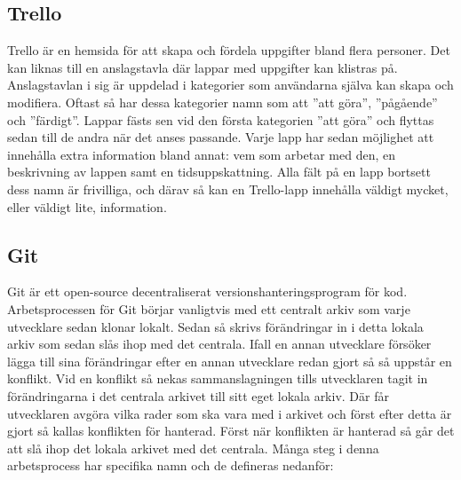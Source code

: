 \subsection*{Trello}
Trello är en hemsida för att skapa och fördela uppgifter bland flera personer. Det kan liknas till en anslagstavla där lappar med uppgifter kan klistras på. Anslagstavlan i sig är uppdelad i kategorier som användarna själva kan skapa och modifiera. Oftast så har dessa kategorier namn som att ''att göra'', ''pågående'' och ''färdigt''. Lappar fästs sen vid den första kategorien ''att göra'' och flyttas sedan till de andra när det anses passande. Varje lapp har sedan möjlighet att innehålla extra information bland annat: vem som arbetar med den, en beskrivning av lappen samt en tidsuppskattning. Alla fält på en lapp bortsett dess namn är frivilliga, och därav så kan en Trello-lapp innehålla väldigt mycket, eller väldigt lite, information.

\subsection*{Git}
Git är ett open-source decentraliserat versionshanteringsprogram för kod\cite{Git}. Arbetsprocessen för Git börjar vanligtvis med ett centralt arkiv som varje utvecklare sedan klonar lokalt. Sedan så skrivs förändringar in i detta lokala arkiv som sedan slås ihop med det centrala. Ifall en annan utvecklare försöker lägga till sina förändringar efter en annan utvecklare redan gjort så så uppstår en konflikt. Vid en konflikt så nekas sammanslagningen tills utvecklaren tagit in förändringarna i det centrala arkivet till sitt eget lokala arkiv. Där får utvecklaren avgöra vilka rader som ska vara med i arkivet och först efter detta är gjort så kallas konflikten för hanterad. Först när konflikten är hanterad så går det att slå ihop det lokala arkivet med det centrala. Många steg i denna arbetsprocess har specifika namn och de defineras nedanför:

